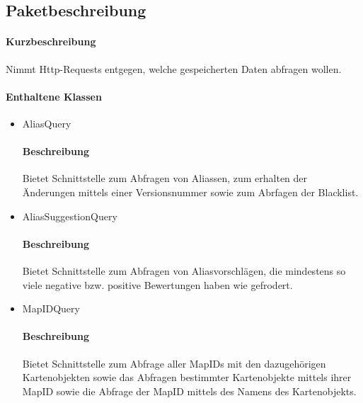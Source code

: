 \subsection*{Paketbeschreibung}%
\paragraph*{Kurzbeschreibung}
Nimmt Http-Requests entgegen, welche gespeicherten Daten abfragen wollen.
\paragraph*{Enthaltene Klassen}
\begin{itemize}
    \item AliasQuery
    		\paragraph*{Beschreibung}
            Bietet Schnittstelle zum Abfragen von Aliassen, zum erhalten der Änderungen mittels einer Versionsnummer sowie zum Abrfagen der Blacklist.
    \item AliasSuggestionQuery
    		\paragraph*{Beschreibung}
    		Bietet Schnittstelle zum Abfragen von Aliasvorschlägen, die mindestens so viele negative bzw. positive Bewertungen haben wie gefrodert.
    \item MapIDQuery
    		\paragraph*{Beschreibung}
    		Bietet Schnittstelle zum Abfrage aller MapIDs mit den dazugehörigen Kartenobjekten sowie das Abfragen bestimmter Kartenobjekte mittels ihrer MapID sowie die Abfrage
            der MapID mittels des Namens des Kartenobjekts.

\end{itemize}